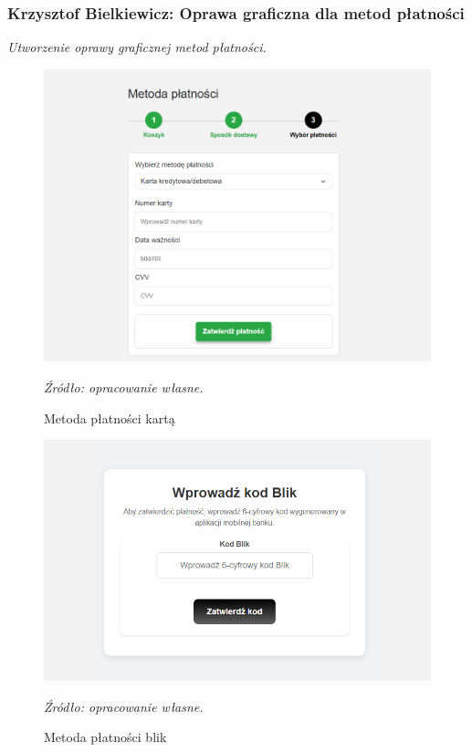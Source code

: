 \documentclass[12pt,a4paper,oneside]{article}
\theoremstyle{definition}
\numberwithin{equation}{section}
\begin{document}
\subsubsection{Krzysztof Bielkiewicz: Oprawa graficzna dla metod płatności}
\label{1.3.10}
\textit{Utworzenie oprawy graficznej metod płatności.}
\begin{figure}[H]
    \centering
    \includegraphics[width=0.8\columnwidth]{images/krzysztofBImages/cart/metody-płatności-karta.png}
    \caption{Metoda płatności kartą}
    \emph{Źródło: opracowanie własne.}
\end{figure}

\begin{figure}[H]
    \centering
    \includegraphics[width=1.0\columnwidth]{images/krzysztofBImages/cart/metody-płatności-blik.png}
    \caption{Metoda płatności blik}
    \emph{Źródło: opracowanie własne.}
\end{figure}
\end{document}

